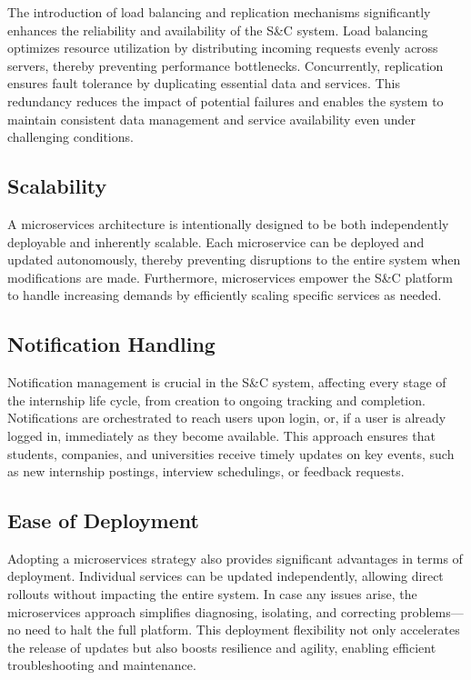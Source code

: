 The introduction of load balancing and replication mechanisms significantly enhances the reliability and availability of the S\&C system. Load balancing optimizes resource utilization by distributing incoming requests evenly across servers, thereby preventing performance bottlenecks. Concurrently, replication ensures fault tolerance by duplicating essential data and services. This redundancy reduces the impact of potential failures and enables the system to maintain consistent data management and service availability even under challenging conditions.

\subsection{Scalability}

A microservices architecture is intentionally designed to be both independently deployable and inherently scalable. Each microservice can be deployed and updated autonomously, thereby preventing disruptions to the entire system when modifications are made. Furthermore, microservices empower the S\&C platform to handle increasing demands by efficiently scaling specific services as needed.

\subsection{Notification Handling}

Notification management is crucial in the S\&C system, affecting every stage of the internship life cycle, from creation to ongoing tracking and completion. Notifications are orchestrated to reach users upon login, or, if a user is already logged in, immediately as they become available. This approach ensures that students, companies, and universities receive timely updates on key events, such as new internship postings, interview schedulings, or feedback requests.

\subsection{Ease of Deployment}

Adopting a microservices strategy also provides significant advantages in terms of deployment. Individual services can be updated independently, allowing direct rollouts without impacting the entire system. In case any issues arise, the microservices approach simplifies diagnosing, isolating, and correcting problems—no need to halt the full platform. This deployment flexibility not only accelerates the release of updates but also boosts resilience and agility, enabling efficient troubleshooting and maintenance.

